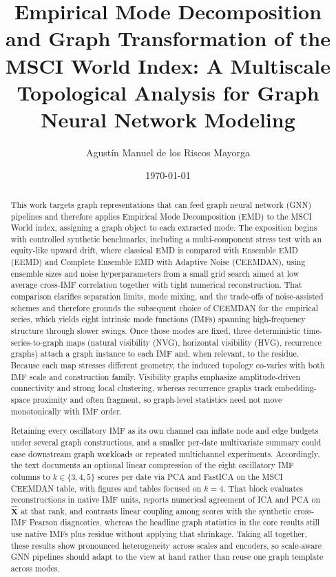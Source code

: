 \documentclass[11pt,a4paper]{article}
\title{Empirical Mode Decomposition and Graph Transformation of the MSCI World Index: A Multiscale Topological Analysis for Graph Neural Network Modeling}
\author{Agustín Manuel de los Riscos Mayorga}
\date{\today}
\begin{document}
\maketitle

\begin{abstract}
This work targets graph representations that can feed graph neural network (GNN) pipelines and therefore applies Empirical Mode Decomposition (EMD) to the MSCI World index, assigning a graph object to each extracted mode. The exposition begins with controlled synthetic benchmarks, including a multi-component stress test with an equity-like upward drift, where classical EMD is compared with Ensemble EMD (EEMD) and Complete Ensemble EMD with Adaptive Noise (CEEMDAN), using ensemble sizes and noise hyperparameters from a small grid search aimed at low average cross-IMF correlation together with tight numerical reconstruction. That comparison clarifies separation limits, mode mixing, and the trade-offs of noise-assisted schemes and therefore grounds the subsequent choice of CEEMDAN for the empirical series, which yields eight intrinsic mode functions (IMFs) spanning high-frequency structure through slower swings. Once those modes are fixed, three deterministic time-series-to-graph maps (natural visibility (NVG), horizontal visibility (HVG), recurrence graphs) attach a graph instance to each  IMF and, when relevant, to the residue. Because each map stresses different geometry, the induced topology co-varies with both IMF scale and construction family. Visibility graphs emphasize amplitude-driven connectivity and strong local clustering, whereas recurrence graphs track embedding-space proximity and often fragment, so graph-level statistics need not move monotonically with IMF order.

Retaining every oscillatory IMF as its own channel can inflate node and edge budgets under several graph constructions, and a smaller per-date multivariate summary could ease downstream graph workloads or repeated multichannel experiments. Accordingly, the text documents an optional linear compression of the eight oscillatory IMF columns to $k\in\{3,4,5\}$ scores per date via PCA and FastICA on the MSCI CEEMDAN table, with figures and tables focused on $k=4$. That block evaluates reconstructions in native IMF units, reports numerical agreement of ICA and PCA on $\hat{\mathbf{X}}$ at that rank, and contrasts linear coupling among scores with the synthetic cross-IMF Pearson diagnostics, whereas the headline graph statistics in the core results still use native IMFs plus residue without applying that shrinkage. Taking all together, these results show pronounced heterogeneity across scales and encoders, so scale-aware GNN pipelines should adapt to the view at hand rather than reuse one graph template across modes.
\end{abstract}
\end{document}
